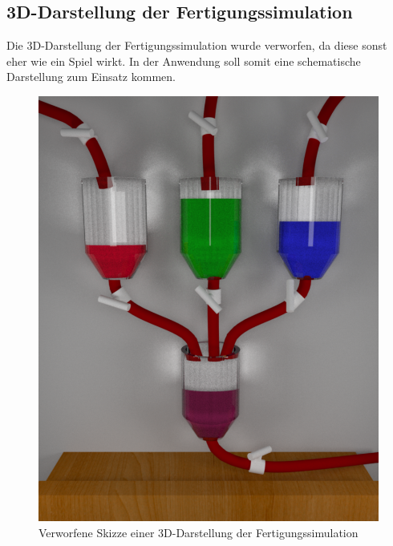 \documentclass[parskip=full]{scrartcl}
\begin{document}
\subsection{3D-Darstellung der Fertigungssimulation}
Die 3D-Darstellung der \gls{Fertigungssimulation} wurde verworfen, da diese sonst eher wie ein Spiel wirkt.
In der Anwendung soll somit eine schematische Darstellung zum Einsatz kommen.
\begin{figure}[h]
  \centering
  \includegraphics[scale=0.3]{./media/ui-sketch-server-3d.png}
  \caption{Verworfene Skizze einer 3D-Darstellung der Fertigungssimulation}
\end{figure}

\pagebreak
\printglossaries

{}
\listoffigures
\end{document}
